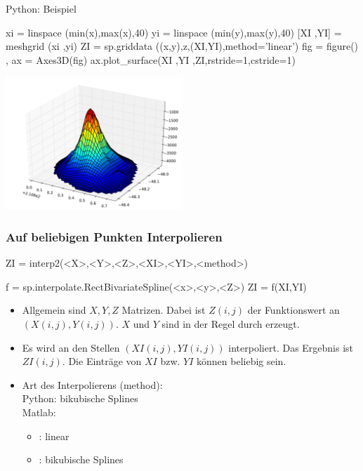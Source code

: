 \documentclass[hyperref={xetex}]{beamer}
\begin{document}
\begin{frame}[fragile]{Python: Beispiel}
\begin{pyin}
xi = linspace (min(x),max(x),40)
yi = linspace (min(y),max(y),40)
[XI ,YI] = meshgrid (xi ,yi)
ZI = sp.griddata ((x,y),z,(XI,YI),method='linear')
fig = figure() , ax = Axes3D(fig)
ax.plot_surface(XI ,YI ,ZI,rstride=1,cstride=1) 
\end{pyin}
\begin{center}
\includegraphics[width=0.5\textwidth]{figures/scattered_data_plot_py}
\end{center}
\end{frame}
%
% 
\begin{frame}[fragile]\frametitle{Auf beliebigen Punkten Interpolieren}
\begin{matlabin}
ZI = interp2(<X>,<Y>,<Z>,<XI>,<YI>,<method>)
\end{matlabin}
\begin{pyin}
f = sp.interpolate.RectBivariateSpline(<x>,<y>,<Z>)
ZI = f(XI,YI)
\end{pyin}
\begin{itemize}
\item Allgemein sind $X,Y,Z$ Matrizen. Dabei ist $Z(i,j)$ der Funktionswert an
  $(X(i,j),Y(i,j))$. $X$ und $Y$ sind in der Regel durch  erzeugt. 
\item Es wird an den Stellen $(XI(i,j),YI(i,j))$ interpoliert. Das Ergebnis
  ist $ZI(i,j)$. Die Einträge von $XI$ bzw. $YI$ k\"onnen beliebig sein. 
\item Art des Interpolierens (method):\\
Python: bikubische Splines\\
Matlab:
\begin{itemize}
 \item {}: linear
 \item {}: bikubische Splines
\end{itemize}
\end{itemize}
\end{frame}
\end{document}
